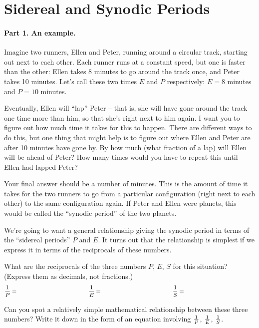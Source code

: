 \section{Sidereal and Synodic Periods}

\makelabheader

\medskip

\paragraph{Part 1. An example.}
Imagine two runners, Ellen and Peter,
running around a circular track, starting out
next to each other. Each runner runs at a constant speed, but one 
is faster than the other: Ellen takes 8 minutes to go around the track
once, and Peter takes 10 minutes. Let's call these two times
$E$ and $P$ respectively: $E=8$ minutes and $P=10$ minutes.


Eventually, Ellen will ``lap'' Peter -- that is, she will have gone around
the track one time more than him, so that she's right
next to him again. I want
you to figure out how much time it takes for this to happen.
There are different ways to do this, but one thing that might help
is to figure out where Ellen and Peter are after 10 minutes have gone by.
By how much (what fraction of a lap) will Ellen will be ahead of 
Peter? How many times would you have to repeat this until Ellen
had lapped Peter?

Your final answer should be a number of minutes. This is the amount
of time it takes for the two runners to go from a particular configuration
(right next to each other) to the same configuration again. If Peter and Ellen
were planets, this would be called the ``synodic period'' of the two planets.

\answerspace{2in}


We're going to want a general relationship giving the synodic period
in terms of the ``sidereal periods'' $P$ and $E$. It turns
out that the relationship is simplest if we express it in terms
of the reciprocals of these numbers.

What are the reciprocals of the three numbers $P$, $E$, $S$ for
this situation? (Express them as decimals, not fractions.)
$$
{1\over P}=
\hskip 1.7in
{1\over E}=
\hskip 1.7in
{1\over S}=
\hskip 1.7in
$$

Can you spot a relatively simple mathematical relationship
between these three numbers? Write it down in the form of an equation
involving ${1\over P}$, ${1\over E}$, ${1\over S}$.


